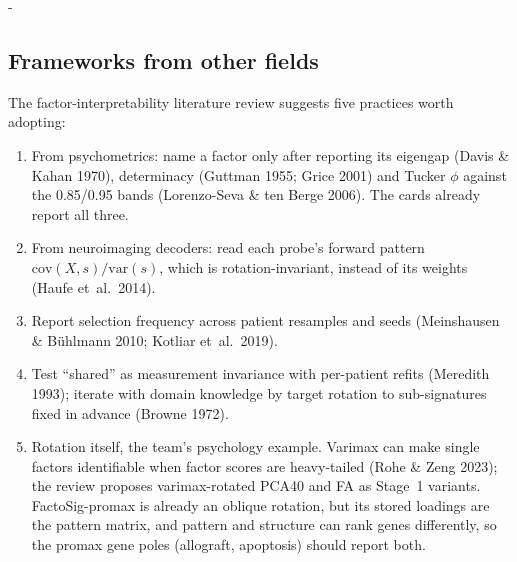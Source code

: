 \makeatletter
\providecommand{\softneedspace}[1]{\par\begingroup\dimen@ii\pagegoal\advance\dimen@ii-\pagetotal
  \ifdim #1>\dimen@ii\ifdim\dimen@ii>\z@\newpage\fi\fi\endgroup}
\makeatother
\softneedspace{6\baselineskip}
\subsection*{Frameworks from other fields}
The factor-interpretability literature review suggests five practices worth adopting:
\begin{enumerate}[leftmargin=*,itemsep=0pt,topsep=0pt]
\item From psychometrics: name a factor only after reporting its eigengap (Davis \& Kahan 1970), determinacy (Guttman 1955; Grice 2001) and Tucker $\phi$ against the 0.85/0.95 bands (Lorenzo-Seva \& ten Berge 2006). The cards already report all three.
\item From neuroimaging decoders: read each probe's forward pattern $\mathrm{cov}(X,s)/\mathrm{var}(s)$, which is rotation-invariant, instead of its weights (Haufe et~al.\ 2014).
\item Report selection frequency across patient resamples and seeds (Meinshausen \& B\"uhlmann 2010; Kotliar et~al.\ 2019).
\item Test ``shared'' as measurement invariance with per-patient refits (Meredith 1993); iterate with domain knowledge by target rotation to sub-signatures fixed in advance (Browne 1972).
\item Rotation itself, the team's psychology example. Varimax can make single factors identifiable when factor scores are heavy-tailed (Rohe \& Zeng 2023); the review proposes varimax-rotated PCA40 and FA as Stage~1 variants. FactoSig-promax is already an oblique rotation, but its stored loadings are the pattern matrix, and pattern and structure can rank genes differently, so the promax gene poles (allograft, apoptosis) should report both.
\end{enumerate}

